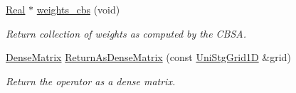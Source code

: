 \begin{DoxyCompactItemize}
\hyperlink{group__c01-roots_gac080bbbf5cbb5502c9f00405f894857d}{Real} $\ast$ \hyperlink{classmtk_1_1Div1D_a163bf1575222651c84ee83092d6734e5}{weights\-\_\-cbs} (void)
\begin{DoxyCompactList}\small\item\em Return collection of weights as computed by the C\-B\-S\-A. \end{DoxyCompactList}\item 
\hyperlink{classmtk_1_1DenseMatrix}{Dense\-Matrix} \hyperlink{classmtk_1_1Div1D_afdbb1e11f05dd77b882f36426229acf7}{Return\-As\-Dense\-Matrix} (const \hyperlink{classmtk_1_1UniStgGrid1D}{Uni\-Stg\-Grid1\-D} \&grid)
\begin{DoxyCompactList}\small\item\em Return the operator as a dense matrix. \end{DoxyCompactList}\end{DoxyCompactItemize}
